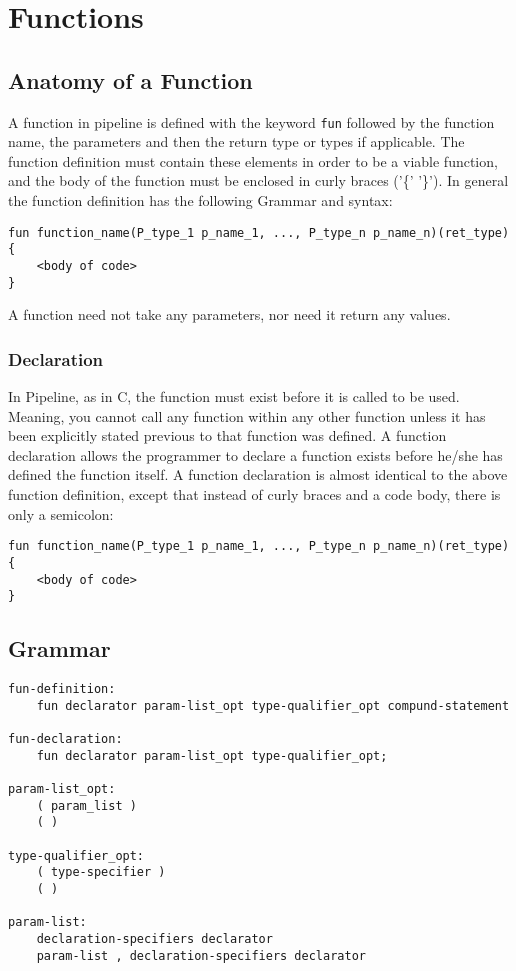 \documentclass[./LRM_main.tex]{subfiles}
\begin{document}
\section{Functions}
\subsection{Anatomy of a Function}
A function in pipeline is defined with the keyword \texttt{fun} followed by the function name, the parameters and then the return type or types if applicable. The function definition must contain these elements in order to be a viable function, and the body of the function must be enclosed in curly braces ('\{' '\}'). In general the function definition has the following Grammar and syntax:\\
\begin{lstlisting}
fun function_name(P_type_1 p_name_1, ..., P_type_n p_name_n)(ret_type)
{
	<body of code>
}
\end{lstlisting}
A function need not take any parameters, nor need it return any values.
\subsubsection{Declaration}
In Pipeline, as in C, the function must exist before it is called to be used. Meaning, you cannot call any function within any other function unless it has been explicitly stated previous to that function was defined. A function declaration allows the programmer to declare a function exists before he/she has defined the function itself. A function declaration is almost identical to the above function definition, except that instead of curly braces and a code body, there is only a semicolon:
\begin{lstlisting}
fun function_name(P_type_1 p_name_1, ..., P_type_n p_name_n)(ret_type)
{
	<body of code>
}
\end{lstlisting}
\subsection{Grammar}
\begin{lstlisting}
fun-definition:
	fun declarator param-list_opt type-qualifier_opt compund-statement

fun-declaration:
	fun declarator param-list_opt type-qualifier_opt;

param-list_opt:
	( param_list )
	( )

type-qualifier_opt:
	( type-specifier )
	( )

param-list:
	declaration-specifiers declarator
	param-list , declaration-specifiers declarator


\end{lstlisting}
\end{document}
